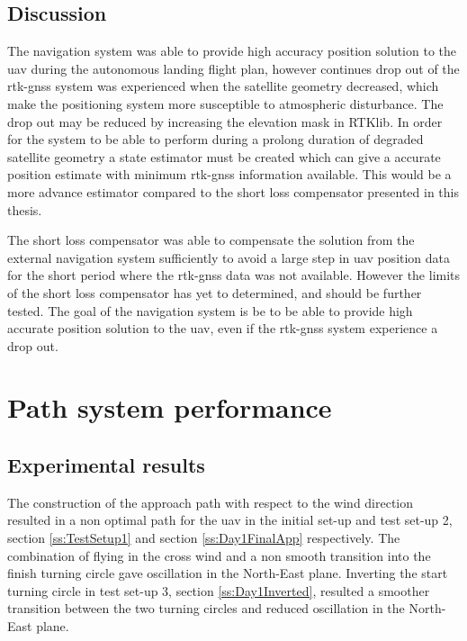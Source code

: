 \subsection{Discussion}
The navigation system was able to provide high accuracy position solution to the \gls{uav} during the autonomous landing flight plan, however continues drop out of the \gls{rtk-gnss} system was experienced when the satellite geometry decreased, which make the positioning system more susceptible to atmospheric disturbance. The drop out may be reduced by increasing the elevation mask in RTKlib. In order for the system to be able to perform during a prolong duration of degraded satellite geometry a state estimator must be created which can give a accurate position estimate with minimum \gls{rtk-gnss} information available. This would be a more advance estimator compared to the short loss compensator presented in this thesis.

The short loss compensator was able to compensate the solution from the external navigation system sufficiently to avoid a large step in \gls{uav} position data for the short period where the \gls{rtk-gnss} data was not available. However the limits of the short loss compensator has yet to determined, and should be further tested. The goal of the navigation system is be to be able to provide high accurate position solution to the \gls{uav}, even if the \gls{rtk-gnss} system experience a drop out.
\section{Path system performance}
\subsection{Experimental results}
The construction of the approach path with respect to the wind direction resulted in a non optimal path for the \gls{uav} in the initial set-up and test set-up 2, section \ref{ss:TestSetup1} and section \ref{ss:Day1FinalApp} respectively. The combination of flying in the cross wind and a non smooth transition into the finish turning circle gave oscillation in the North-East plane. Inverting the start turning circle in test set-up 3, section \ref{ss:Day1Inverted}, resulted a smoother transition between the two turning circles and reduced oscillation in the North-East plane.

